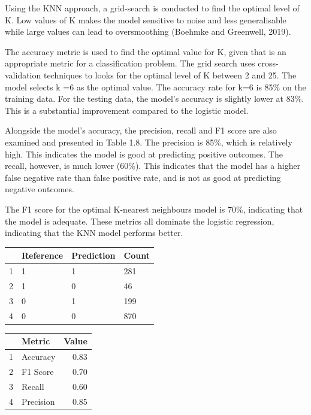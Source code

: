 \documentclass[11pt,preprint, authoryear]{elsarticle}
\let\origtable\table
\let\endorigtable\endtable
\renewenvironment{table}[1][2] {
    \expandafter\origtable\expandafter[H]
} {
    \endorigtable
}
\numberwithin{equation}{section}
\numberwithin{figure}{section}
\numberwithin{table}{section}
\begin{document}
Using the KNN approach, a grid-search is conducted to find the optimal
level of K. Low values of K makes the model sensitive to noise and less
generalisable while large values can lead to oversmoothing (Boehmke and
Greenwell, 2019).

The accuracy metric is used to find the optimal value for K, given that
is an appropriate metric for a classification problem. The grid search
uses cross-validation techniques to looks for the optimal level of K
between 2 and 25. The model selects k =6 as the optimal value. The
accuracy rate for k=6 is 85\% on the training data. For the testing
data, the model's accuracy is slightly lower at 83\%. This is a
substantial improvement compared to the logistic model.

Alongside the model's accuracy, the precision, recall and F1 score are
also examined and presented in Table 1.8. The precision is 85\%, which
is relatively high. This indicates the model is good at predicting
positive outcomes. The recall, however, is much lower (60\%). This
indicates that the model has a higher false negative rate than false
positive rate, and is not as good at predicting negative outcomes.

The F1 score for the optimal K-nearest neighbours model is 70\%,
indicating that the model is adequate. These metrics all dominate the
logistic regression, indicating that the KNN model performs better.

\begin{table}[H]
\centering
\begin{tabular}{rlll}
  \hline
 & Reference & Prediction & Count \\ 
  \hline
1 & 1 & 1 & 281 \\ 
  2 & 1 & 0 &  46 \\ 
  3 & 0 & 1 & 199 \\ 
  4 & 0 & 0 & 870 \\ 
   \hline
\end{tabular}
\caption{Confusion Matrix for KNN Model \label{tab1}} 
\end{table}

\begin{table}[H]
\centering
\begin{tabular}{rlr}
  \hline
 & Metric & Value \\ 
  \hline
1 & Accuracy & 0.83 \\ 
  2 & F1 Score & 0.70 \\ 
  3 & Recall & 0.60 \\ 
  4 & Precision & 0.85 \\ 
   \hline
\end{tabular}
\caption{Metrics for KNN Model \label{tab1}} 
\end{table}
\end{document}
